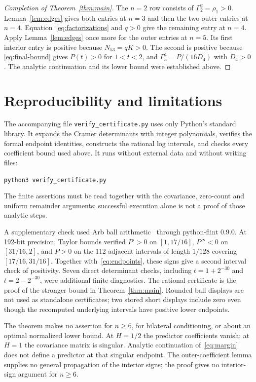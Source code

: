 \documentclass[11pt]{article}
\begin{document}
\begin{proof}[Completion of Theorem~\ref{thm:main}]
The $n=2$ row consists of $\Gamma_2^2=\rho_1>0$.
Lemma~\ref{lem:edges} gives both entries at $n=3$ and then the two outer
entries at $n=4$. Equation~\eqref{eq:factorizations} and $q>0$ give the
remaining entry at $n=4$. Apply Lemma~\ref{lem:edges} once more for the
outer entries at $n=5$. Its first interior entry is positive because
$N_{53}=qK>0$. The second is positive because
\eqref{eq:final-bound} gives $P(t)>0$ for $1<t<2$, and
$\Gamma_5^4=P/(16D_4)$ with $D_4>0$.
The analytic continuation and its lower bound were established above.
\end{proof}

\section{Reproducibility and limitations}

The accompanying file \texttt{verify\_certificate.py} uses only Python's
standard library. It expands the Cramer determinants with integer
polynomials, verifies the formal endpoint identities, constructs the
rational log intervals, and checks every coefficient bound used above.
It runs without external data and without writing files:
\begin{center}\texttt{python3 verify\_certificate.py}\end{center}
The finite assertions must be read together with the covariance,
zero-count and uniform remainder arguments; successful execution alone
is not a proof of those analytic steps.

A supplementary check used Arb ball arithmetic~\cite{Johansson2017}
through python-flint 0.9.0. At 192-bit precision, Taylor bounds verified
$P'>0$ on $[1,17/16]$, $P'''<0$ on $[31/16,2]$, and $P>0$ on the
112 adjacent intervals of length $1/128$ covering $[17/16,31/16]$.
Together with~\eqref{eq:endpoints}, these signs give a second interval
check of positivity. Seven direct determinant checks, including
$t=1+2^{-30}$ and $t=2-2^{-30}$, were additional finite diagnostics.
The rational certificate is the proof of the stronger bound in
Theorem~\ref{thm:main}. Rounded ball displays are not used as standalone
certificates; two stored short displays include zero even though the
recomputed underlying intervals have positive lower endpoints.

The theorem makes no assertion for $n\ge6$, for bilateral conditioning,
or about an optimal normalized lower bound. At $H=1/2$ the predictor
coefficients vanish; at $H=1$ the covariance matrix is singular.
Analytic continuation of~\eqref{eq:margin} does not define a predictor
at that singular endpoint. The outer-coefficient lemma supplies no
general propagation of the interior signs; the proof gives no
interior-sign argument for $n\ge6$.
\end{document}
